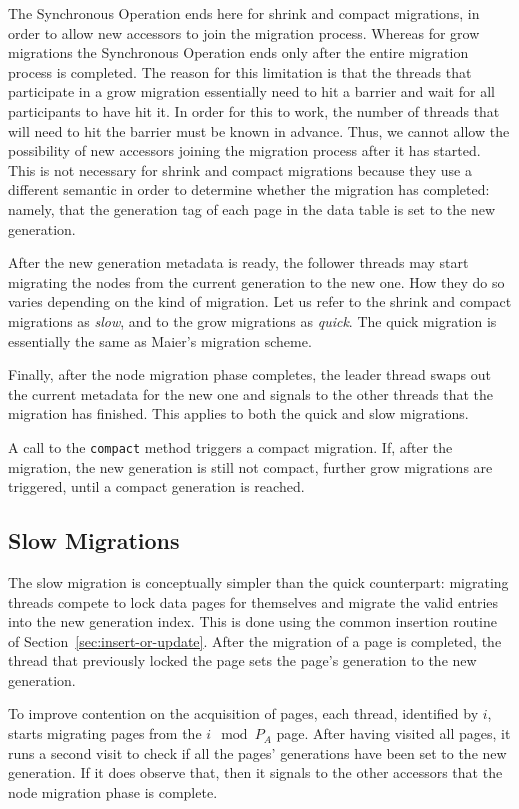 The Synchronous Operation ends here for shrink and compact migrations, in order to allow new accessors to join the migration process.
Whereas for grow migrations the Synchronous Operation ends only after the entire migration process is completed.
The reason for this limitation is that the threads that participate in a grow migration essentially need to hit a barrier and wait for all participants to have hit it.
In order for this to work, the number of threads that will need to hit the barrier must be known in advance.
Thus, we cannot allow the possibility of new accessors joining the migration process after it has started.
This is not necessary for shrink and compact migrations because they use a different semantic in order to determine whether the migration has completed: namely, that the generation tag of each page in the data table is set to the new generation.

After the new generation metadata is ready, the follower threads may start migrating the nodes from the current generation to the new one.
How they do so varies depending on the kind of migration.
Let us refer to the shrink and compact migrations as \emph{slow}, and to the grow migrations as \emph{quick}.
The quick migration is essentially the same as Maier's migration scheme.

Finally, after the node migration phase completes, the leader thread swaps out the current metadata for the new one and signals to the other threads that the migration has finished.
This applies to both the quick and slow migrations.

A call to the \texttt{compact} method triggers a compact migration.
If, after the migration, the new generation is still not compact, further grow migrations are triggered, until a compact generation is reached.

\subsection{Slow Migrations}\label{subsec:slow-migrations}

The slow migration is conceptually simpler than the quick counterpart: migrating threads compete to lock data pages for themselves and migrate the valid entries into the new generation index.
This is done using the common insertion routine of Section~\ref{sec:insert-or-update}.
After the migration of a page is completed, the thread that previously locked the page sets the page's generation to the new generation.

To improve contention on the acquisition of pages, each thread, identified by $i$, starts migrating pages from the $i \mod P_A$ page.
After having visited all pages, it runs a second visit to check if all the pages' generations have been set to the new generation.
If it does observe that, then it signals to the other accessors that the node migration phase is complete.

